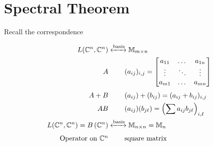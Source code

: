 \section{Spectral Theorem}

Recall the correspondence

\begin{align*}
    L(\complexnums^n, \complexnums^n)                            & \xleftrightarrow{\text{basis}} \matrices_{m\times n}                                                    \\
    A                                                            & \phantom{\xleftrightarrow{\text{basis}}} (a_{ij})_{i,j} = \begin{bmatrix}a_{11}&\dots&a_{1n}\\\vdots&\ddots&\vdots\\a_{m1}&\dots&a_{mn}\end{bmatrix}                     \\
    A + B                                                        & \phantom{\xleftrightarrow{\text{basis}}} (a_{ij}) + (b_{ij}) = (a_{ij} + b_{ij})_{i,j}                  \\
    AB                                                           & \phantom{\xleftrightarrow{\text{basis}}} (a_{ij})(b_{j\ell})=\left(\sum a_{ij}b_{j\ell}\right)_{i,\ell} \\
    L(\complexnums^n, \complexnums^n) = \boundop{\complexnums^n} & \xleftrightarrow{\text{basis}} \matrices_{n\times n} = \matrices_n                                      \\
    \hbox{Operator on $\complexnums^n$}                          & \phantom{\xleftrightarrow{\text{basis}}} \hbox{square matrix}
\end{align*}

